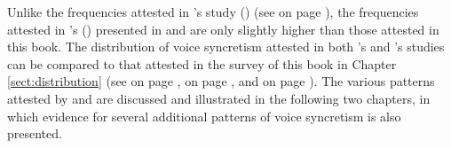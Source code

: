 Unlike the frequencies attested in \citeauthor{geniusiene:1987}’s study (\citeyear{geniusiene:1987}) (see  on page \pageref{tab:ch3:geniusiene-patterns}), the frequencies attested in  \citeauthor{haspelmath:1990}’s (\citeyear{haspelmath:1990}) presented in  and  are only slightly higher than those attested in this book. The distribution of voice syncretism attested in both \citeauthor{geniusiene:1987}’s and \citeauthor{haspelmath:1990}’s studies can be compared to that attested in the survey of this book in Chapter \ref{sect:distribution} (see  on page \pageref{tab:ch6:voice-syncretism-macroarea-minimal},  on page \pageref{tab:ch6:voice-syncretism-maximal-simplex-macroarea}, and  on page \pageref{tab:ch6:voice-syncretism-maximal-complex-macroarea}). The various patterns attested by \citeauthor{geniusiene:1987} and \citeauthor{haspelmath:1990} are discussed and illustrated in the following two chapters, in which evidence for several additional patterns of voice syncretism is also presented.

